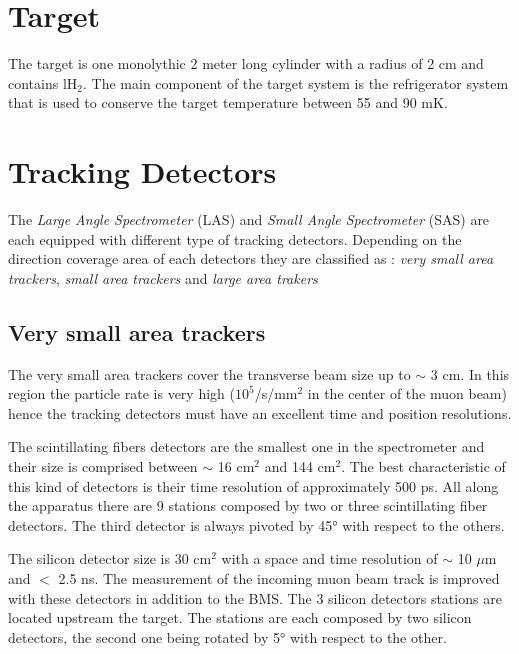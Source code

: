 \section{Target}

The target is one monolythic 2 meter long cylinder with a radius of 2 cm and contains lH$_2$. The main component of the target system is the refrigerator system that is used to conserve the target temperature between 55 and 90 mK.


\section{Tracking Detectors}\label{sec:track}

The \textit{Large Angle Spectrometer} (LAS) and \textit{Small Angle Spectrometer} (SAS) are each equipped with different type of tracking detectors. Depending on the direction coverage area of each detectors they are classified as :
\textit{very small area trackers}, \textit{small area trackers} and \textit{large area trakers}

\subsection{Very small area trackers}

The very small area trackers cover the transverse beam size up to $\sim$ 3 cm. In this region the particle rate is very
high ($10^5$/s/mm$^2$ in the center of the muon beam) hence the tracking detectors must have an excellent time and position
resolutions.

The scintillating fibers detectors are the smallest one in the spectrometer and their size is comprised between $\sim$ 16 cm$^2$
and 144 cm$^2$. The best characteristic of this kind of detectors is their time resolution of approximately 500 ps. All along the
apparatus there are 9 stations composed by two or three scintillating fiber detectors. The third detector is always pivoted by 45°
with respect to the others.

The silicon detector size is 30 cm$^2$ with a space and time resolution of $\sim$ 10 $\mu$m and $<$ 2.5 ns. The measurement
of the incoming muon beam track is improved with these detectors in addition to the BMS. The 3 silicon detectors stations are
located upstream the target. The stations are each composed by two silicon detectors, the second one being rotated by 5° with
respect to the other.

